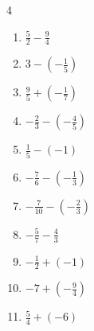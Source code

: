 \begin{multicols}{4}
\begin{enumerate}
  \item $\displaystyle \frac{5}{2} - \frac{9}{4}$


  \item $\displaystyle 3 - \left(-\frac{1}{5}\right)$


\columnbreak %

\resetques

  \item $\displaystyle \frac{9}{5} + \left(-\frac{1}{7}\right)$


  \item $\displaystyle -\frac{2}{3} - \left(-\frac{4}{5}\right)$


  \item $\displaystyle \frac{1}{5} - \left(-1\right)$


  \item $\displaystyle -\frac{7}{6} - \left(-\frac{1}{3}\right)$


  \item $\displaystyle -\frac{7}{10} - \left(-\frac{2}{3}\right)$


  \item $\displaystyle -\frac{5}{7} - \frac{4}{3}$


  \item $\displaystyle -\frac{1}{2} + \left(-1\right)$


  \item $\displaystyle -7 + \left(-\frac{9}{4}\right)$


  \item $\displaystyle \frac{5}{4} + \left(-6\right)$



\end{enumerate}
\end{multicols}
